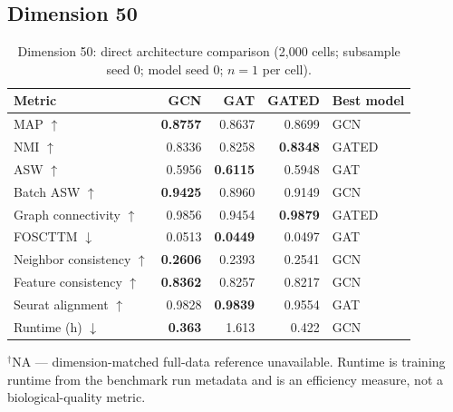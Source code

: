 \documentclass[10pt]{article}
\begin{document}
\subsection{Dimension 50}
\begin{table}[H]
\centering
\small
\caption{Dimension 50: direct architecture comparison (2,000 cells; subsample seed 0; model seed 0; $n=1$ per cell).}
\label{tab:dim50}
\begin{tabular}{@{}lrrrl@{}}
\toprule
Metric & GCN & GAT & GATED & Best model \\
\midrule
MAP $\uparrow$ & \textbf{0.8757} & 0.8637 & 0.8699 & GCN \\
NMI $\uparrow$ & 0.8336 & 0.8258 & \textbf{0.8348} & GATED \\
ASW $\uparrow$ & 0.5956 & \textbf{0.6115} & 0.5948 & GAT \\
Batch ASW $\uparrow$ & \textbf{0.9425} & 0.8960 & 0.9149 & GCN \\
Graph connectivity $\uparrow$ & 0.9856 & 0.9454 & \textbf{0.9879} & GATED \\
FOSCTTM $\downarrow$ & 0.0513 & \textbf{0.0449} & 0.0497 & GAT \\
Neighbor consistency $\uparrow$ & \textbf{0.2606} & 0.2393 & 0.2541 & GCN \\
Feature consistency $\uparrow$ & \textbf{0.8362} & 0.8257 & 0.8217 & GCN \\
Seurat alignment $\uparrow$ & 0.9828 & \textbf{0.9839} & 0.9554 & GAT \\
Runtime (h) $\downarrow$ & \textbf{0.363} & 1.613 & 0.422 & GCN \\
\bottomrule
\end{tabular}
\begin{minipage}{0.92\linewidth}\footnotesize\vspace{2pt}$^{\dagger}$NA --- dimension-matched full-data reference unavailable. Runtime is training runtime from the benchmark run metadata and is an efficiency measure, not a biological-quality metric.\end{minipage}
\end{table}
\end{document}
